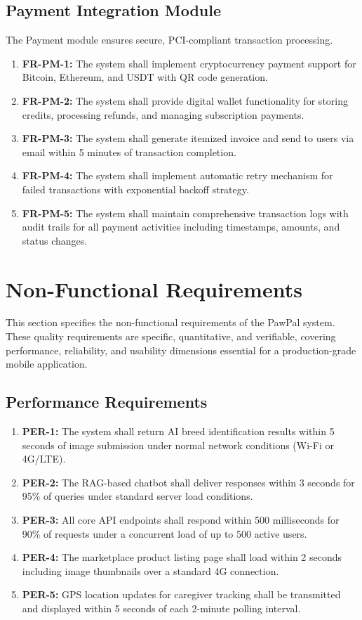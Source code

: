 \subsection{Payment Integration Module}
The Payment module ensures secure, PCI-compliant transaction processing.
\begin{enumerate}
    \item \textbf{FR-PM-1:} The system shall implement cryptocurrency payment support for Bitcoin, Ethereum, and USDT with QR code generation.
    \item \textbf{FR-PM-2:} The system shall provide digital wallet functionality for storing credits, processing refunds, and managing subscription payments.
    \item \textbf{FR-PM-3:} The system shall generate itemized invoice and send to users via email within 5 minutes of transaction completion.
    \item \textbf{FR-PM-4:} The system shall implement automatic retry mechanism for failed transactions with exponential backoff strategy.
    \item \textbf{FR-PM-5:} The system shall maintain comprehensive transaction logs with audit trails for all payment activities including timestamps, amounts, and status changes.
\end{enumerate}

\section{Non-Functional Requirements}
This section specifies the non-functional requirements of the PawPal system. These quality requirements are specific, quantitative, and verifiable, covering performance, reliability, and usability dimensions essential for a production-grade mobile application.

\subsection{Performance Requirements}
\begin{enumerate}
    \item \textbf{PER-1:} The system shall return AI breed identification results within 5 seconds of image submission under normal network conditions (Wi-Fi or 4G/LTE).
    \item \textbf{PER-2:} The RAG-based chatbot shall deliver responses within 3 seconds for 95\% of queries under standard server load conditions.
    \item \textbf{PER-3:} All core API endpoints shall respond within 500 milliseconds for 90\% of requests under a concurrent load of up to 500 active users.
    \item \textbf{PER-4:} The marketplace product listing page shall load within 2 seconds including image thumbnails over a standard 4G connection.
    \item \textbf{PER-5:} GPS location updates for caregiver tracking shall be transmitted and displayed within 5 seconds of each 2-minute polling interval.
\end{enumerate}

